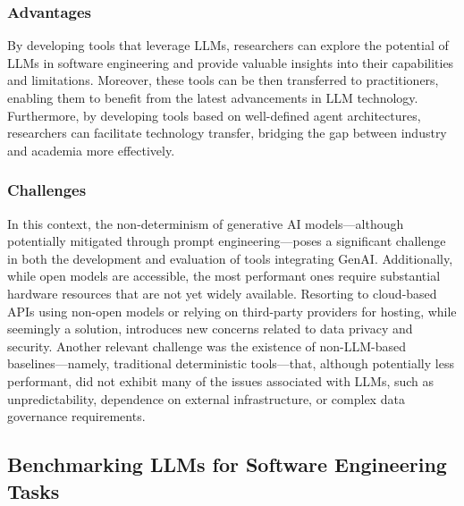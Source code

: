 
\subsubsection{Advantages}

By developing tools that leverage LLMs, researchers can explore the potential of LLMs in software engineering and provide valuable insights into their capabilities and limitations.
Moreover, these tools can be then transferred to practitioners, enabling them to benefit from the latest advancements in LLM technology.
Furthermore, by developing tools based on well-defined agent architectures, researchers can facilitate technology transfer, bridging the gap between industry and academia more effectively. 

\subsubsection{Challenges}

In this context, the non-determinism of generative AI models—although potentially mitigated through prompt engineering—poses a significant challenge in both the development and evaluation of tools integrating GenAI. 
Additionally, while open models are accessible, the most performant ones require substantial hardware resources that are not yet widely available. Resorting to cloud-based APIs using non-open models or relying on third-party providers for hosting, while seemingly a solution, introduces new concerns related to data privacy and security.
Another relevant challenge was the existence of non-LLM-based baselines—namely, traditional deterministic tools—that, although potentially less performant, did not exhibit many of the issues associated with LLMs, such as unpredictability, dependence on external infrastructure, or complex data governance requirements.

\subsection{Benchmarking LLMs for Software Engineering Tasks}


